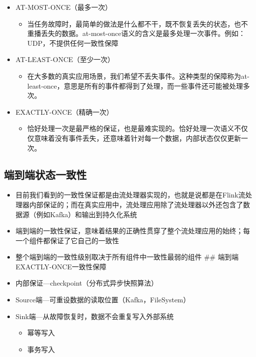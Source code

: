 \begin{itemize}
\tightlist
\item
  AT-MOST-ONCE（最多一次）

  \begin{itemize}
  \tightlist
  \item
    当任务故障时，最简单的做法是什么都不干，既不恢复丢失的状态，也不重播丢失的数据。at-most-once语义的含义是最多处理一次事件。例如：UDP，不提供任何一致性保障
  \end{itemize}
\item
  AT-LEAST-ONCE（至少一次）

  \begin{itemize}
  \tightlist
  \item
    在大多数的真实应用场景，我们希望不丢失事件。这种类型的保障称为at-least-once，意思是所有的事件都得到了处理，而一些事件还可能被处理多次。
  \end{itemize}
\item
  EXACTLY-ONCE（精确一次）

  \begin{itemize}
  \tightlist
  \item
    恰好处理一次是最严格的保证，也是最难实现的。恰好处理一次语义不仅仅意味着没有事件丢失，还意味着针对每一个数据，内部状态仅仅更新一次。
  \end{itemize}
\end{itemize}

\hypertarget{ux7aefux5230ux7aefux72b6ux6001ux4e00ux81f4ux6027}{%
\subsection{端到端状态一致性}\label{ux7aefux5230ux7aefux72b6ux6001ux4e00ux81f4ux6027}}

\begin{itemize}
\item
  目前我们看到的一致性保证都是由流处理器实现的，也就是说都是在Flink流处理器内部保证的；而在真实应用中，流处理应用除了流处理器以外还包含了数据源（例如Kafka）和输出到持久化系统
\item
  端到端的一致性保证，意味着结果的正确性贯穿了整个流处理应用的始终；每一个组件都保证了它自己的一致性
\item
  整个端到端的一致性级别取决于所有组件中一致性最弱的组件 \#\#
  端到端EXACTLY-ONCE一致性保障
\item
  内部保证---checkpoint（分布式异步快照算法）
\item
  Source端---可重设数据的读取位置（Kafka，FileSystem）
\item
  Sink端---从故障恢复时，数据不会重复写入外部系统

  \begin{itemize}
  \tightlist
  \item
    幂等写入
  \item
    事务写入
  \end{itemize}
\end{itemize}

